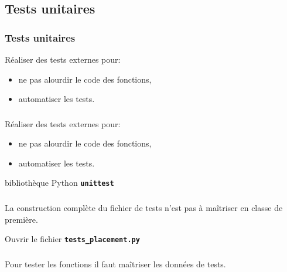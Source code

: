 \documentclass[svgnames,11pt]{beamer}
\begin{document}
\subsection{Tests unitaires}
\begin{frame}
    \frametitle{Tests unitaires}

    Réaliser des tests externes pour:
    \begin{itemize}
        \item ne pas alourdir le code des fonctions,
        \item automatiser les tests.
    \end{itemize}

\end{frame}
\begin{frame}
    \frametitle{}
    Réaliser des tests externes pour:
    \begin{itemize}
        \item ne pas alourdir le code des fonctions,
        \item automatiser les tests.
    \end{itemize}
    \vspace{2cm}
    \begin{center}
        {\Large bibliothèque Python \textbf{\texttt{unittest}}}
    \end{center}

\end{frame}
\begin{frame}
    \frametitle{}

    \begin{aretenir}
        La construction complète du fichier de tests n'est pas à maîtriser en classe de première.
    \end{aretenir}
    \begin{activite}
        Ouvrir le fichier \textbf{\texttt{tests\_placement.py}}
    \end{activite}
\end{frame}
\begin{frame}[fragile]
    \frametitle{}
    \begin{aretenir}[]
        Pour tester les fonctions il faut maîtriser les données de tests.
    \end{aretenir}
    \begin{center}
    \end{center}
    


\end{frame}
\end{document}
